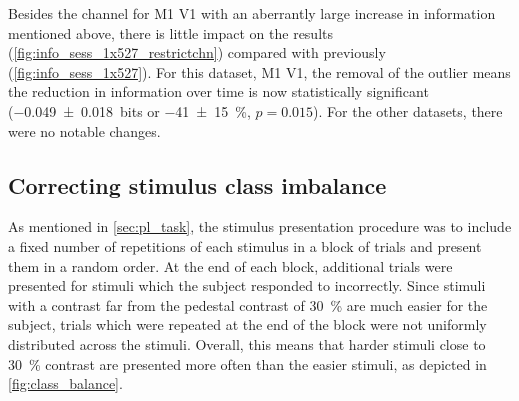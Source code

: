 %
%
%

Besides the channel for \ac{M1} \ac{V1} with an aberrantly large increase in information mentioned above, there is little impact on the results (\autoref{fig:info_sess_1x527_restrictchn}) compared with previously (\autoref{fig:info_sess_1x527}).
For this dataset, \ac{M1} \ac{V1}, the removal of the outlier means the reduction in information over time is now statistically significant (\SI{-0.049\pm0.018}{bits} or \SI{-41\pm15}{\percent}, $p=0.015$).
For the other datasets, there were no notable changes.


\subsection{Correcting stimulus class imbalance}
\label{sec:pl_class_imbalance}

As mentioned in \autoref{sec:pl_task}, the stimulus presentation procedure was to include a fixed number of repetitions of each stimulus in a block of trials and present them in a random order.
At the end of each block, additional trials were presented for stimuli which the subject responded to incorrectly.
Since stimuli with a contrast far from the pedestal contrast of \SI{30}{\percent} are much easier for the subject, trials which were repeated at the end of the block were not uniformly distributed across the stimuli.
Overall, this means that harder stimuli close to \SI{30}{\percent} contrast are presented more often than the easier stimuli, as depicted in \autoref{fig:class_balance}.



